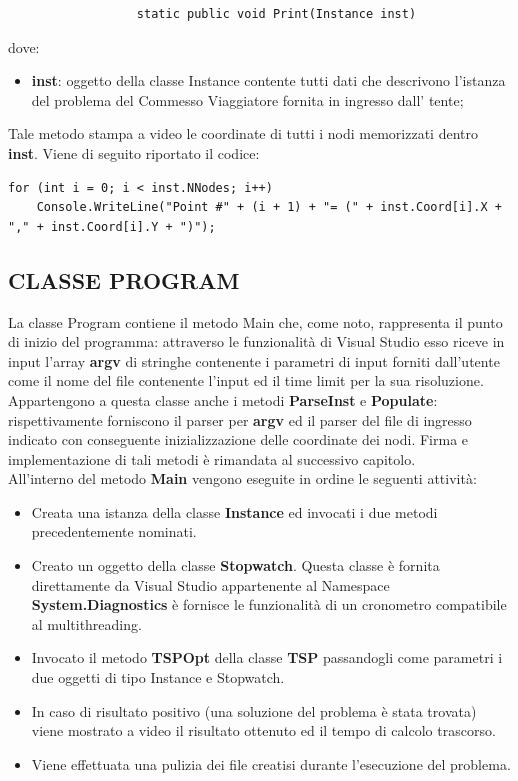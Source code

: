 \documentclass[11pt]{article}
\begin{document}
\begin{lstlisting}
                  static public void Print(Instance inst)
\end{lstlisting}

dove:

\begin{itemize}
\item \textbf{inst}: oggetto della classe Instance contente tutti dati che descrivono l'istanza del problema del Commesso Viaggiatore fornita in ingresso dall' tente;
\end{itemize}

Tale metodo stampa a video le coordinate di tutti i nodi memorizzati dentro \textbf{inst}. Viene di seguito riportato il codice:

\begin{lstlisting}
for (int i = 0; i < inst.NNodes; i++)
    Console.WriteLine("Point #" + (i + 1) + "= (" + inst.Coord[i].X + "," + inst.Coord[i].Y + ")");
\end{lstlisting}

\subsection*{CLASSE PROGRAM}

La classe Program contiene il metodo Main che, come noto, rappresenta il punto di inizio del programma: attraverso le funzionalità di Visual Studio esso riceve in input l'array \textbf{argv} di stringhe contenente i parametri di input forniti dall'utente come il nome del file contenente l'input ed il time limit per la sua risoluzione. Appartengono a questa classe anche i metodi \textbf{ParseInst} e \textbf{Populate}: rispettivamente forniscono il parser per \textbf{argv} ed il parser del file di ingresso indicato con conseguente inizializzazione delle coordinate dei nodi. Firma e implementazione di tali metodi è rimandata al successivo capitolo.\\
All'interno del metodo \textbf{Main} vengono eseguite in ordine le seguenti attività:
\begin{itemize}
    \item Creata una istanza della classe \textbf{Instance} ed invocati i due metodi precedentemente nominati.
    \item Creato un oggetto della classe \textbf{Stopwatch}. Questa classe è fornita direttamente da Visual Studio appartenente al Namespace \textbf{System.Diagnostics} è fornisce le funzionalità di un cronometro compatibile al multithreading.
    \item Invocato il metodo \textbf{TSPOpt} della classe \textbf{TSP} passandogli come parametri i due oggetti di tipo Instance e Stopwatch.
    \item In caso di risultato positivo (una soluzione del problema è stata trovata) viene mostrato a video il risultato ottenuto ed il tempo di calcolo trascorso.
    \item Viene effettuata una pulizia dei file creatisi durante l'esecuzione del problema.
\end{itemize}
\end{document}
